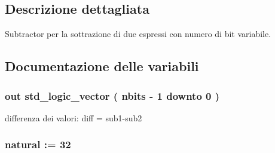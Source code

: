 \subsection{Descrizione dettagliata}
Subtractor per la sottrazione di due espressi con numero di bit variabile. 



\subsection{Documentazione delle variabili}
\subsubsection[{\texorpdfstring{diff}{diff}}]{ {\bfseries \textcolor{vhdlchar}{out}\textcolor{vhdlchar}{ }} {\bfseries \textcolor{vhdlchar}{std\+\_\+logic\+\_\+vector}\textcolor{vhdlchar}{ }\textcolor{vhdlchar}{(}\textcolor{vhdlchar}{ }\textcolor{vhdlchar}{ }\textcolor{vhdlchar}{ }\textcolor{vhdlchar}{ }{\bfseries {\bf nbits}} \textcolor{vhdlchar}{-\/}\textcolor{vhdlchar}{ } \textcolor{vhdldigit}{1} \textcolor{vhdlchar}{ }\textcolor{vhdlchar}{downto}\textcolor{vhdlchar}{ }\textcolor{vhdlchar}{ } \textcolor{vhdldigit}{0} \textcolor{vhdlchar}{ }\textcolor{vhdlchar}{)}\textcolor{vhdlchar}{ }} \hspace{0.3cm}{\ttfamily [Port]}}\hypertarget{group___subtractor_ga0fa68103d429fdc11539b6baa81d0d0d}{}\label{group___subtractor_ga0fa68103d429fdc11539b6baa81d0d0d}


differenza dei valori\+: diff = sub1-\/sub2 

\subsubsection[{\texorpdfstring{ieee}{ieee}}]{\hspace{0.3cm}{\ttfamily [Library]}}\hypertarget{group___subtractor_ga0a6af6eef40212dbaf130d57ce711256}{}\label{group___subtractor_ga0a6af6eef40212dbaf130d57ce711256}
\subsubsection[{\texorpdfstring{nbits}{nbits}}]{ {\bfseries \textcolor{vhdlchar}{ }} {\bfseries \textcolor{vhdlchar}{natural}\textcolor{vhdlchar}{ }\textcolor{vhdlchar}{ }\textcolor{vhdlchar}{\+:}\textcolor{vhdlchar}{=}\textcolor{vhdlchar}{ }\textcolor{vhdlchar}{ } \textcolor{vhdldigit}{32} \textcolor{vhdlchar}{ }} \hspace{0.3cm}{\ttfamily [Generic]}}\hypertarget{group___subtractor_gae1435c07d0cd54b521535e2f8de6f94e}{}\label{group___subtractor_gae1435c07d0cd54b521535e2f8de6f94e}
